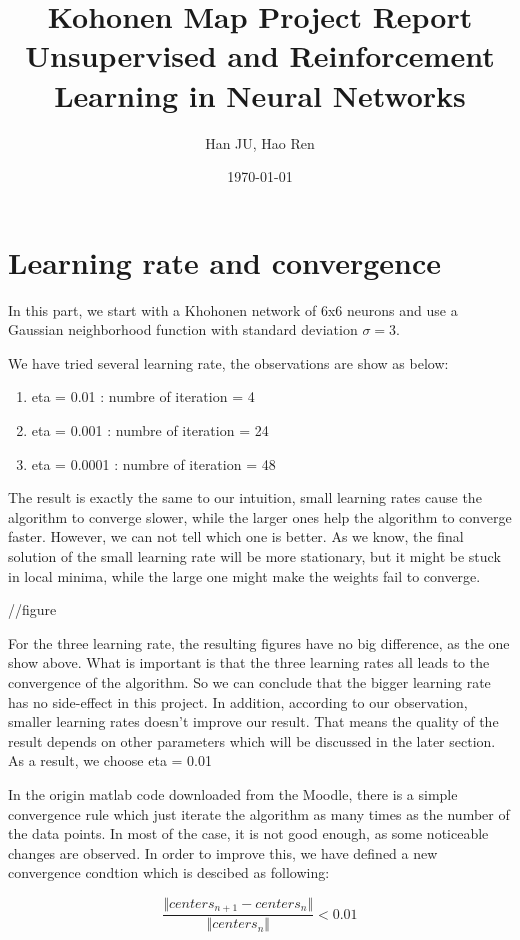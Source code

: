 \documentclass[a4paper, 12pt]{article}
\title{Kohonen Map Project Report \\ \vspace{0.5cm} \large Unsupervised and Reinforcement Learning in Neural Networks}
\author{Han JU, Hao Ren}
\date{\today}
\begin{document}
\maketitle

\section{Learning rate and convergence}
In this part, we start with a Khohonen network of 6x6 neurons and use a Gaussian neighborhood function with standard deviation $\sigma = 3$.

We have tried several learning rate, the observations are show as below:

\begin{enumerate}
\item eta = 0.01 : numbre of iteration = 4
\item eta = 0.001 : numbre of iteration = 24
\item eta = 0.0001 : numbre of iteration = 48
\end{enumerate}

The result is exactly the same to our intuition, small learning rates cause the algorithm to converge slower, while the larger ones help the algorithm to converge faster. However, we can not tell which one is better. As we know, the final solution of the small learning rate will be more stationary, but it might be stuck in local minima, while the large one might make the weights fail to converge.

//figure

For the three learning rate, the resulting figures have no big difference, as the one show above. What is important is that the three learning rates all leads to the convergence of the algorithm. So we can conclude that the bigger learning rate has no side-effect in this project. In addition, according to our observation, smaller learning rates doesn't improve our result. That means the quality of the result depends on other parameters which will be discussed in the later section. As a result, we choose eta = 0.01

In the origin matlab code downloaded from the Moodle, there is a
simple convergence rule which just iterate the algorithm as many times
as the number of the data points. In most of the case, it is not good enough, as some noticeable changes are observed. In order to improve this, we have defined a new convergence condtion which is descibed as following:

\begin{equation}
  \frac{\Vert centers_{n+1} - centers_n\Vert}{\Vert centers_n \Vert}
  < 0.01
\end{equation}
\end{document}
